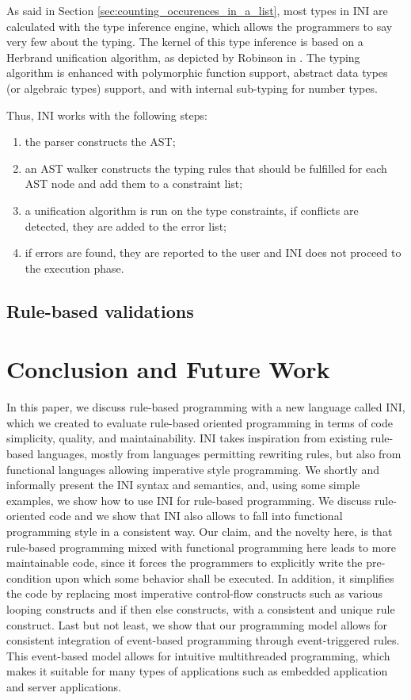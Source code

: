 \documentclass{sig-alternate}
\begin{document}
As said in Section \ref{sec:counting_occurences_in_a_list}, most types in INI are calculated with the type inference engine, which allows the programmers to say very few about the typing. The kernel of this type inference is based on a Herbrand unification algorithm, as depicted by Robinson in \cite{robinson1965}. The typing algorithm is enhanced with polymorphic function support, abstract data types (or algebraic types) support, and with internal sub-typing for number types.

Thus, INI works with the following steps:

\begin{enumerate}
\item the parser constructs the AST;
\item an AST walker constructs the typing rules that should be fulfilled for each AST node and add them to a constraint list;
\item a unification algorithm is run on the type constraints, if conflicts are detected, they are added to the error list;
\item if errors are found, they are reported to the user and INI does not proceed to the execution phase.
\end{enumerate}

\subsection{Rule-based validations}

\section{Conclusion and Future Work}

In this paper, we discuss rule-based programming with a new language called INI, which we created to evaluate rule-based oriented programming in terms of code simplicity, quality, and maintainability. INI takes inspiration from existing rule-based languages, mostly from languages permitting rewriting rules, but also from functional languages allowing imperative style programming. We shortly and informally present the INI syntax and semantics, and, using some simple examples, we show how to use INI for rule-based programming. We discuss rule-oriented code and we show that INI also allows to fall into functional programming style in a consistent way. Our claim, and the novelty here, is that rule-based programming mixed with functional programming here leads to more maintainable code, since it forces the programmers to explicitly write the pre-condition upon which some behavior shall be executed. In addition, it simplifies the code by replacing most imperative control-flow constructs such as various looping constructs and if then else constructs, with a consistent and unique rule construct. Last but not least, we show that our programming model allows for consistent integration of event-based programming through event-triggered rules. This event-based model allows for intuitive multithreaded programming, which makes it suitable for many types of applications such as embedded application and server applications. 


\end{document}
